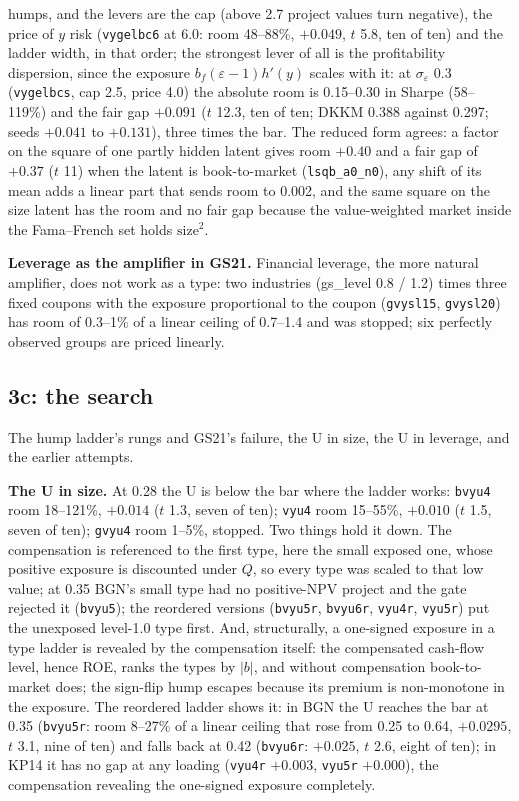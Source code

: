 humps, and the levers are the cap (above 2.7 project values turn negative), the price of $y$ risk (\texttt{vygelbc6} at 6.0: room 48--88\%, $+0.049$, $t$ 5.8, ten of ten) and the ladder width, in that order; the strongest lever of all is the profitability dispersion, since the exposure $b_f(\varepsilon-1)h'(y)$ scales with it: at $\sigma_\varepsilon$ 0.3 (\texttt{vygelbcs}, cap 2.5, price 4.0) the absolute room is 0.15--0.30 in Sharpe (58--119\%) and the fair gap $+0.091$ ($t$ 12.3, ten of ten; DKKM 0.388 against 0.297; seeds $+0.041$ to $+0.131$), three times the bar. The reduced form agrees: a factor on the square of one partly hidden latent gives room $+0.40$ and a fair gap of $+0.37$ ($t$ 11) when the latent is book-to-market (\texttt{lsqb\_a0\_n0}), any shift of its mean adds a linear part that sends room to 0.002, and the same square on the size latent has the room and no fair gap because the value-weighted market inside the Fama--French set holds $\mathrm{size}^2$.

\noindent\textbf{Leverage as the amplifier in GS21.} Financial leverage, the more natural amplifier, does not work as a type: two industries (gs\_level 0.8 / 1.2) times three fixed coupons with the exposure proportional to the coupon (\texttt{gvysl15}, \texttt{gvysl20}) has room of 0.3--1\% of a linear ceiling of 0.7--1.4 and was stopped; six perfectly observed groups are priced linearly.

\subsection*{3c: the search}
The hump ladder's rungs and GS21's failure, the U in size, the U in leverage, and the earlier attempts.


\noindent\textbf{The U in size.} At 0.28 the U is below the bar where the ladder works: \texttt{bvyu4} room 18--121\%, $+0.014$ ($t$ 1.3, seven of ten); \texttt{vyu4} room 15--55\%, $+0.010$ ($t$ 1.5, seven of ten); \texttt{gvyu4} room 1--5\%, stopped. Two things hold it down. The compensation is referenced to the first type, here the small exposed one, whose positive exposure is discounted under $Q$, so every type was scaled to that low value; at 0.35 BGN's small type had no positive-NPV project and the gate rejected it (\texttt{bvyu5}); the reordered versions (\texttt{bvyu5r}, \texttt{bvyu6r}, \texttt{vyu4r}, \texttt{vyu5r}) put the unexposed level-1.0 type first. And, structurally, a one-signed exposure in a type ladder is revealed by the compensation itself: the compensated cash-flow level, hence ROE, ranks the types by $|b|$, and without compensation book-to-market does; the sign-flip hump escapes because its premium is non-monotone in the exposure. The reordered ladder shows it: in BGN the U reaches the bar at 0.35 (\texttt{bvyu5r}: room 8--27\% of a linear ceiling that rose from 0.25 to 0.64, $+0.0295$, $t$ 3.1, nine of ten) and falls back at 0.42 (\texttt{bvyu6r}: $+0.025$, $t$ 2.6, eight of ten); in KP14 it has no gap at any loading (\texttt{vyu4r} $+0.003$, \texttt{vyu5r} $+0.000$), the compensation revealing the one-signed exposure completely.

